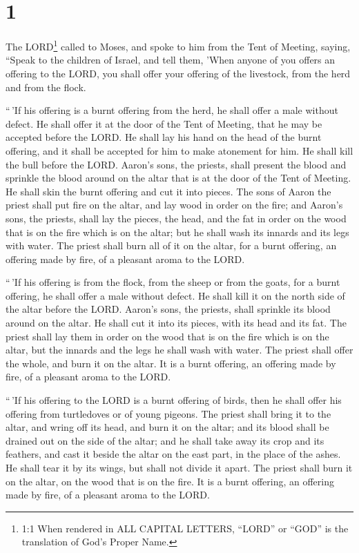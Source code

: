 \hypertarget{section}{%
\section{1}\label{section}}

 The LORD\footnote{1:1 When rendered in ALL CAPITAL LETTERS,
  ``LORD'' or ``GOD'' is the translation of God's Proper Name.} called
to Moses, and spoke to him from the Tent of Meeting, saying,
 ``Speak to the children of Israel, and tell them, 'When
anyone of you offers an offering to the LORD, you shall offer your
offering of the livestock, from the herd and from the flock.

 ``\,'If his offering is a burnt offering from the herd, he
shall offer a male without defect. He shall offer it at the door of the
Tent of Meeting, that he may be accepted before the LORD. 
He shall lay his hand on the head of the burnt offering, and it shall be
accepted for him to make atonement for him.  He shall kill
the bull before the LORD. Aaron's sons, the priests, shall present the
blood and sprinkle the blood around on the altar that is at the door of
the Tent of Meeting.  He shall skin the burnt offering and
cut it into pieces.  The sons of Aaron the priest shall put
fire on the altar, and lay wood in order on the fire;  and
Aaron's sons, the priests, shall lay the pieces, the head, and the fat
in order on the wood that is on the fire which is on the altar;
 but he shall wash its innards and its legs with water. The
priest shall burn all of it on the altar, for a burnt offering, an
offering made by fire, of a pleasant aroma to the LORD.

 ``\,'If his offering is from the flock, from the sheep or
from the goats, for a burnt offering, he shall offer a male without
defect.  He shall kill it on the north side of the altar
before the LORD. Aaron's sons, the priests, shall sprinkle its blood
around on the altar.  He shall cut it into its pieces, with
its head and its fat. The priest shall lay them in order on the wood
that is on the fire which is on the altar,  but the innards
and the legs he shall wash with water. The priest shall offer the whole,
and burn it on the altar. It is a burnt offering, an offering made by
fire, of a pleasant aroma to the LORD.

 ``\,'If his offering to the LORD is a burnt offering of
birds, then he shall offer his offering from turtledoves or of young
pigeons.  The priest shall bring it to the altar, and wring
off its head, and burn it on the altar; and its blood shall be drained
out on the side of the altar;  and he shall take away its
crop and its feathers, and cast it beside the altar on the east part, in
the place of the ashes.  He shall tear it by its wings, but
shall not divide it apart. The priest shall burn it on the altar, on the
wood that is on the fire. It is a burnt offering, an offering made by
fire, of a pleasant aroma to the LORD.

